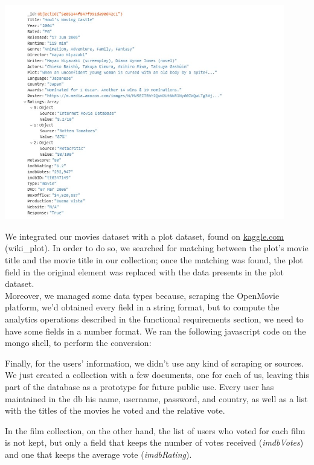 \documentclass[a4paper, oneside]{article}
\begin{document}
\begin{minipage}{\linewidth}
\begin{center}
\vspace{1mm}
\includegraphics[height = 94mm]{./images/screens/elementJSONExample.jpg} 
\vspace{6mm}
\label{fig:elementJSONExample}
\vspace{5mm}
\end{center}
\end{minipage}
We integrated our movies dataset with a plot dataset, found on \url{kaggle.com} (wiki\_plot). In order to do so, we searched for matching between the plot’s movie title and the movie title in our collection; once the matching was found, the plot field in the original element was replaced with the data presents in the plot dataset.\\
Moreover, we managed some data types because, scraping the OpenMovie platform, we'd obtained every field in a string format, but to compute the analytics operations described in the functional requirements section, we need to have some fields in a number format. We ran the following javascript code on the mongo shell, to perform the conversion:
\vspace{2mm}

\vspace{5mm}

Finally, for the users' information, we didn't use any kind of scraping or sources. We just created a collection with a few documents, one for each of us, leaving this part of the database as a prototype for future public use. Every user has maintained in the db his name, username, password, and country, as well as a list with the titles of the movies he voted and the relative vote.

In the film collection, on the other hand, the list of users who voted for each film is not kept, but only a field that keeps the number of votes received (\textit{imdbVotes}) and one that keeps the average vote (\textit{imdbRating}).
\end{document}
